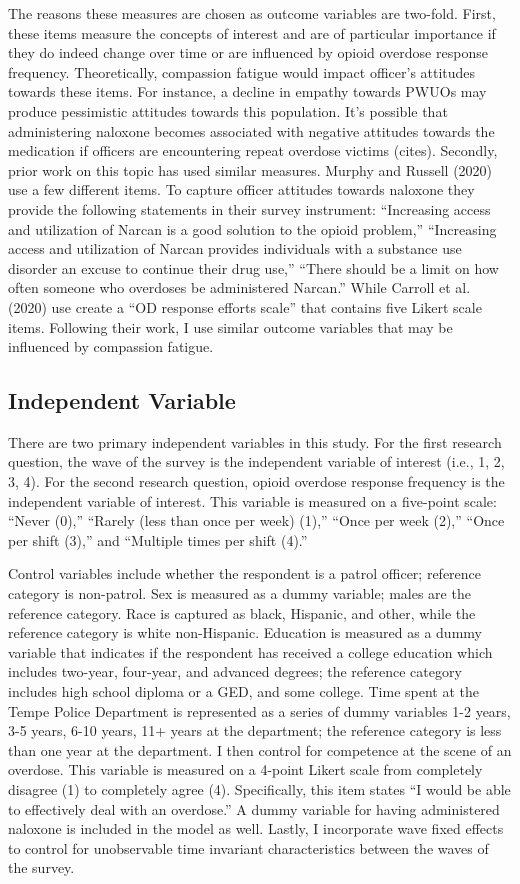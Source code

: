 The reasons these measures are chosen as outcome variables are two-fold. First, these items measure the concepts of interest and are of particular importance if they do indeed change over time or are influenced by opioid overdose response frequency. Theoretically, compassion fatigue would impact officer's attitudes towards these items. For instance, a decline in empathy towards PWUOs may produce pessimistic attitudes towards this population. It's possible that administering naloxone becomes associated with negative attitudes towards the medication if officers are encountering repeat overdose victims (cites). Secondly, prior work on this topic has used similar measures. Murphy and Russell (2020) use a few different items. To capture officer attitudes towards naloxone they provide the following statements in their survey instrument: “Increasing access and utilization of Narcan is a good solution to the opioid problem,” “Increasing access and utilization of Narcan provides individuals with a substance use disorder an excuse to continue their drug use,” “There should be a limit on how often someone who overdoses be administered Narcan.” While Carroll et al. (2020) use create a “OD response efforts scale” that contains five Likert scale items. Following their work, I use similar outcome variables that may be influenced by compassion fatigue. 

\subsection{Independent Variable}

There are two primary independent variables in this study. For the first research question, the wave of the survey is the independent variable of interest (i.e., 1, 2, 3, 4). For the second research question, opioid overdose response frequency is the independent variable of interest. This variable is measured on a five-point scale: “Never (0),” “Rarely (less than once per week) (1),” “Once per week (2),” “Once per shift (3),” and “Multiple times per shift (4).”

Control variables include whether the respondent is a patrol officer; reference category is non-patrol. Sex is measured as a dummy variable; males are the reference category. Race is captured as black, Hispanic, and other, while the reference category is white non-Hispanic. Education is measured as a dummy variable that indicates if the respondent has received a college education which includes two-year, four-year, and advanced degrees; the reference category includes high school diploma or a GED, and some college. Time spent at the Tempe Police Department is represented as a series of dummy variables 1-2 years, 3-5 years, 6-10 years, 11+ years at the department; the reference category is less than one year at the department. I then control for competence at the scene of an overdose. This variable is measured on a 4-point Likert scale from completely disagree (1) to completely agree (4). Specifically, this item states “I would be able to effectively deal with an overdose.” A dummy variable for having administered naloxone is included in the model as well. Lastly, I incorporate wave fixed effects to control for unobservable time invariant characteristics between the waves of the survey.

